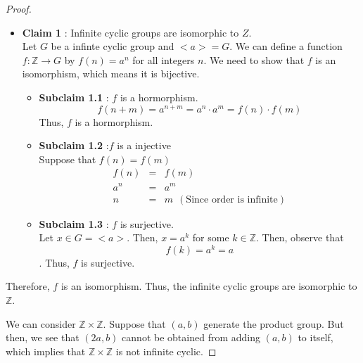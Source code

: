 \documentclass[
]{book}
\providecommand{\tightlist}{%
  \setlength{\itemsep}{0pt}\setlength{\parskip}{0pt}}
\theoremstyle{definition}
\theoremstyle{definition}
\theoremstyle{definition}
\theoremstyle{definition}
\theoremstyle{remark}
\begin{document}
\begin{proof}
\leavevmode

\begin{itemize}
\item
  \textbf{Claim 1} : Infinite cyclic groups are isomorphic to \(Z\).\\
  Let \(G\) be a infinte cyclic group and \(<a>=G\).
  We can define a function \(f: \mathbb{Z} \rightarrow G\) by \(f(n) = a^n\) for all integers \(n\). We need to show that \(f\) is an isomorphism, which means it is bijective.

  \begin{itemize}
  \tightlist
  \item
    \textbf{Subclaim 1.1} : \(f\) is a hormorphism.\\
    \[f(n+m)=a^{n+m}=a^n \cdot a^m =f(n)\cdot f(m)\]
    Thus, \(f\) is a hormorphism.
  \item
    \textbf{Subclaim 1.2} :\(f\) is a injective\\
    Suppose that \(f(n)=f(m)\)
    \begin{eqnarray}
      f(n)&=&f(m)\\
      a^n &=& a^m \\
      n&=& m ~~(\text{Since order is infinite})
    \end{eqnarray}
  \item
    \textbf{Subclaim 1.3} : \(f\) is surjective.\\
    Let \(x\in G=<a>\). Then, \(x=a^k\) for some \(k\in \mathbb{Z}\). Then, observe that
    \[f(k)=a^k=a \].
    Thus, \(f\) is surjective.
  \end{itemize}
\end{itemize}

Therefore, \(f\) is an isomorphism. Thus, the infinite cyclic groups are isomorphic to \(\mathbb{Z}\).

We can consider \(\mathbb{Z}\times \mathbb{Z}\). Suppose that \((a, b)\) generate the product group. But then, we see that \((2a, b)\) cannot be obtained from adding \((a, b)\) to itself, which implies that \(\mathbb{Z}\times \mathbb{Z}\) is not infinite cyclic.

\end{proof}
\end{document}

